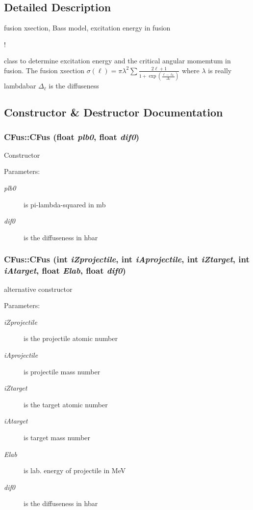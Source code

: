 \subsection{Detailed Description}
fusion xsection, Bass model, excitation energy in fusion 

!

class to determine excitation energy and the critical angular momemtum in fusion. The fusion xsection $ \sigma(\ell) = \pi\lambda^2 \sum \frac{2\ell +1} {1+\exp\left(\frac{\ell-\ell_0}{\Delta_{\ell}}\right)}$ where $\lambda$ is really lambdabar $ \Delta_{\ell}$ is the diffuseness 



\subsection{Constructor \& Destructor Documentation}
\subsubsection{\setlength{\rightskip}{0pt plus 5cm}CFus::CFus (float {\em plb0}, float {\em dif0})}\label{classCFus_e492c8e30d88ce0b14f313151bc28f8c}


Constructor \begin{Desc}
\item[Parameters:]
\begin{description}
\item[{\em plb0}]is pi-lambda-squared in mb \item[{\em dif0}]is the diffuseness in hbar \end{description}
\end{Desc}
\subsubsection{\setlength{\rightskip}{0pt plus 5cm}CFus::CFus (int {\em i\-Zprojectile}, int {\em i\-Aprojectile}, int {\em i\-Ztarget}, int {\em i\-Atarget}, float {\em Elab}, float {\em dif0})}\label{classCFus_0be33f4a10bde2e62e4521fc0b3a6ae0}


alternative constructor \begin{Desc}
\item[Parameters:]
\begin{description}
\item[{\em i\-Zprojectile}]is the projectile atomic number \item[{\em i\-Aprojectile}]is projectile mass number \item[{\em i\-Ztarget}]is the target atomic number \item[{\em i\-Atarget}]is target mass number \item[{\em Elab}]is lab. energy of projectile in Me\-V \item[{\em dif0}]is the diffuseness in hbar \end{description}
\end{Desc}



